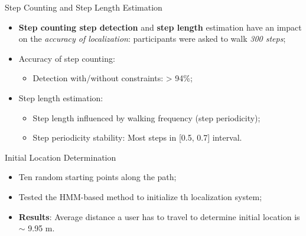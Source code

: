 \begin{frame}{Step Counting and Step Length Estimation}
    \begin{itemize}
        \item \textbf{Step counting step detection} and \textbf{step length} estimation have an impact on the \textit{accuracy of localization}: participants were asked to walk \textit{300 steps};
        \item Accuracy of step counting:
            \begin{itemize}
                \item Detection with/without constraints: > 94\%;
            \end{itemize}
        \item Step length estimation:
            \begin{itemize}
                \item Step length influenced by walking frequency (step periodicity);
                \item Step periodicity stability: Most steps in [0.5, 0.7] interval.
            \end{itemize}
    \end{itemize}
\end{frame}

\begin{frame}{Initial Location Determination}
    \begin{itemize}
        \item Ten random starting points along the path;
        \item Tested the HMM-based method to initialize th localization system;
        \item \textbf{Results}: Average distance a user has to travel to determine initial location is $\sim$ 9.95 m.
    \end{itemize}
\end{frame}

